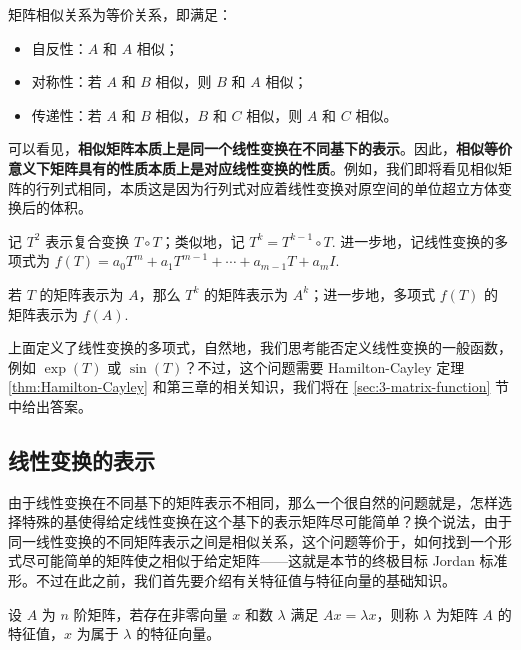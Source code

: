 \begin{property}
矩阵相似关系为等价关系，即满足：
\begin{itemize}
    \item 自反性：$A$ 和 $A$ 相似；
    \item 对称性：若 $A$ 和 $B$ 相似，则 $B$ 和 $A$ 相似；
    \item 传递性：若 $A$ 和 $B$ 相似，$B$ 和 $C$ 相似，则 $A$ 和 $C$ 相似。
\end{itemize}
\end{property}

\begin{remark}
可以看见，\textbf{相似矩阵本质上是同一个线性变换在不同基下的表示}。因此，\textbf{相似等价意义下矩阵具有的性质本质上是对应线性变换的性质}。例如，我们即将看见相似矩阵的行列式相同，本质这是因为行列式对应着线性变换对原空间的单位超立方体变换后的体积。
\end{remark}

\begin{definition}[线性变换的多项式]
记 $T^2$ 表示复合变换 $T\circ T$；类似地，记 $T^k=T^{k-1}\circ T$. 进一步地，记线性变换的多项式为 $f(T)=a_0T^m+a_1T^{m-1}+\cdots+a_{m-1}T+a_mI$.
\end{definition}

\begin{theorem}[线性变换的多项式的矩阵表示]
若 $T$ 的矩阵表示为 $A$，那么 $T^k$ 的矩阵表示为 $A^k$；进一步地，多项式 $f(T)$ 的矩阵表示为 $f(A)$.
\end{theorem}

上面定义了线性变换的多项式，自然地，我们思考能否定义线性变换的一般函数，例如 $\exp(T)$ 或 $\sin(T)$？不过，这个问题需要 Hamilton-Cayley 定理 \ref{thm:Hamilton-Cayley} 和第三章的相关知识，我们将在 \ref{sec:3-matrix-function} 节中给出答案。


\subsection{线性变换的表示}

由于线性变换在不同基下的矩阵表示不相同，那么一个很自然的问题就是，怎样选择特殊的基使得给定线性变换在这个基下的表示矩阵尽可能简单？换个说法，由于同一线性变换的不同矩阵表示之间是相似关系，这个问题等价于，如何找到一个形式尽可能简单的矩阵使之相似于给定矩阵——这就是本节的终极目标 Jordan 标准形。不过在此之前，我们首先要介绍有关特征值与特征向量的基础知识。

\begin{definition}[矩阵的特征值与特征向量]
设 $A$ 为 $n$ 阶矩阵，若存在非零向量 $x$ 和数 $\lambda$ 满足 $Ax=\lambda x$，则称 $\lambda$ 为矩阵 $A$ 的特征值，$x$ 为属于 $\lambda$ 的特征向量。
\end{definition}

